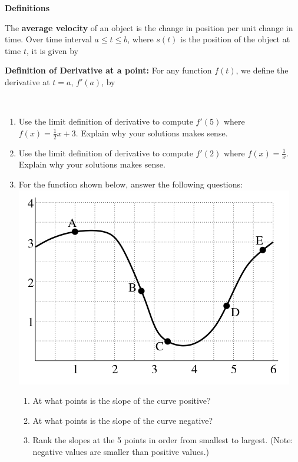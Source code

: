 \documentclass[12pt]{article}
\begin{document}
\begin{tcolorbox}
\textbf{Definitions}

The \textbf{average velocity} of an object is the change in position per unit change in time. Over time interval $a\leq t \leq b$, where $s(t)$ is the position of the object at time $t$, it is given by 
	\vspace{30mm}

\textbf{Definition of Derivative at a point:} For any function $f(t)$, we define the derivative at $t=a$, $f'(a)$, by 

\vspace{30mm}
	
	\vspace{10mm}
\end{tcolorbox}
\newpage
~
\begin{enumerate}

\item Use the limit definition of derivative to compute $f'(5) $ where $f(x)=\frac{1}{2}x+3$.
Explain why your solutions makes sense.

\vfill
\vfill
\item Use the limit definition of derivative to compute $f'(2) $ where $f(x)=\frac{1}{x}$.
Explain why your solutions makes sense.
\vfill
\vfill
\item For the function shown below, answer the following questions:\\
\includegraphics [scale=.75]{2_1b}
	\begin{enumerate}
	\item At what points is the slope of the curve positive?
	\vfill
	\item At what points is the slope of the curve negative?
	\vfill
	\item Rank the slopes at the 5 points in order from smallest to largest. (Note: negative values are smaller than positive values.)

	\end{enumerate}
	
\end{enumerate}
\end{document}
